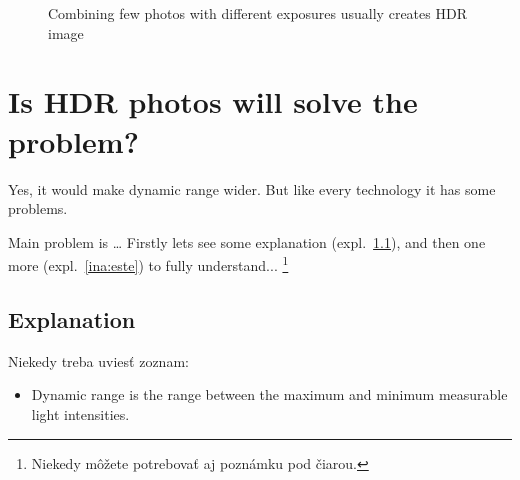 \documentclass[10pt,twoside,english,a4paper]{article}
\begin{document}

\begin{figure*}[tbh]
	\caption{Combining few photos with different exposures 
	usually creates HDR image}
	\label{f:rozhod}
\end{figure*}



\section{Is HDR photos will solve the problem?} \label{ina}
Yes, it would make dynamic range wider. But like every technology 
it has some problems.

Main problem is \ldots{} Firstly lets see some explanation (expl.~\ref{ina:nejake}), 
and then one more (expl.~\ref{ina:este}) to fully understand...
\footnote{Niekedy môžete potrebovať aj poznámku pod čiarou.}



\subsection{Explanation} \label{ina:nejake}

Niekedy treba uviesť zoznam:
\begin{itemize}
	\item Dynamic range is the range between the maximum and minimum
	measurable light intensities.
		      
\end{itemize}


\end{document}
